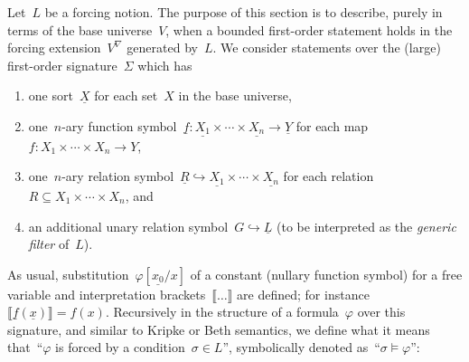 \documentclass[com,11pt,crcready]{iosart2x}
\theoremstyle{definition}
\theoremstyle{plain}
\theoremstyle{remark}
\newcommand{\?}{\,{:}\,}
\newcommand{\forces}{\vDash}
\renewcommand{\_}{\mathpunct{.}\,}
\begin{document}
Let~$L$ be a forcing notion. The purpose of this section is to describe, purely
in terms of the base universe~$V$, when a bounded first-order statement holds
in the forcing extension~$V^\nabla$ generated by~$L$. We consider statements
over the (large) first-order signature~$\Sigma$ which has
\begin{enumerate}
\item one sort~$\underline{X}$ for each set~$X$ in the base universe,
\item one~$n$-ary function symbol~$\underline{f} : \underline{X_1} \times
\cdots \times \underline{X_n} \to \underline{Y}$ for each map~$f : X_1 \times
\cdots \times X_n \to Y$,
\item one~$n$-ary relation symbol~$\underline{R} \hookrightarrow
\underline{X_1} \times \cdots \times \underline{X_n}$ for each relation~$R
\subseteq X_1 \times \cdots \times X_n$, and
\item an additional unary relation symbol~$G \hookrightarrow \underline{L}$ (to
be interpreted as the \emph{generic filter} of~$L$).
\end{enumerate}
As usual, substitution~$\varphi[\underline{x_0}/x]$ of a constant (nullary
function symbol) for a free variable and interpretation
brackets~$\llbracket\ldots\rrbracket$ are defined; for
instance~$\llbracket\underline{f}(\underline{x})\rrbracket = f(x)$.
Recursively in the structure of a formula~$\varphi$ over this signature, and
similar to Kripke or Beth semantics, we define what it means that~``$\varphi$
is forced by a condition~$\sigma \in L$'', symbolically denoted as~``$\sigma
\forces \varphi$'':
\newcommand{\defeqv}{\quad\text{iff}\quad}
\end{document}
